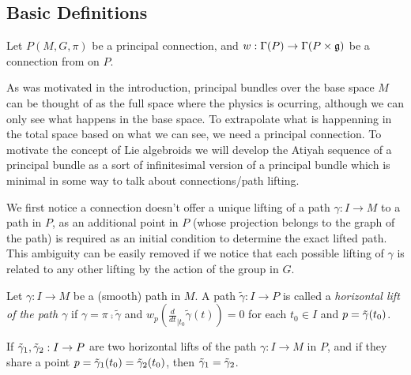 \subsection{Basic Definitions}

Let $P(M, G, \pi)$ be a principal connection, and $w : \Gamma(P) \to \Gamma(P \times \mathfrak{g})$ be a connection from on $P$.

As was motivated in the introduction, principal bundles over the base space $M$ can be thought of as the full space where the physics is ocurring, although we can only see what happens in the base space. To extrapolate what is happenning in the total space based on what we can see, we need a principal connection. To motivate the concept of Lie algebroids we will develop the Atiyah sequence of a principal bundle as a sort of infinitesimal version of a principal bundle which is minimal in some way to talk about connections/path lifting.

We first notice a connection doesn't offer a unique lifting of a path $\gamma:I \to M$ to a path in $P$, as an additional point in $P$ (whose projection belongs to the graph of the path) is required as an initial condition to determine the exact lifted path. This ambiguity can be easily removed if we notice that each possible lifting of $\gamma$ is related to any other lifting by the action of the group in $G$.

\begin{definition} 
Let $\gamma: I \to M$ be a (smooth) path in $M$. A path $\tilde{\gamma}: I \to P$ is called a \emph{horizontal lift of the path $\gamma$} if $\gamma = \pi \comp \tilde{\gamma}$ and $w_p(\frac{d}{dt}_{|t_0} \tilde{\gamma}(t)) = 0$ for each $t_0 \in I$ and $p = \Tilde{\gamma}(t_0)$.
\end{definition}

\begin{proposition} 
If $\Tilde{\gamma}_1, \Tilde{\gamma}_2:I \to P$ are two horizontal lifts of the path $\gamma:I \to M$ in $P$, and if they share a point $p = \Tilde{\gamma}_1(t_0) = \Tilde{\gamma}_2(t_0)$, then $\Tilde{\gamma}_1 = \Tilde{\gamma}_2$. 
\end{proposition}

